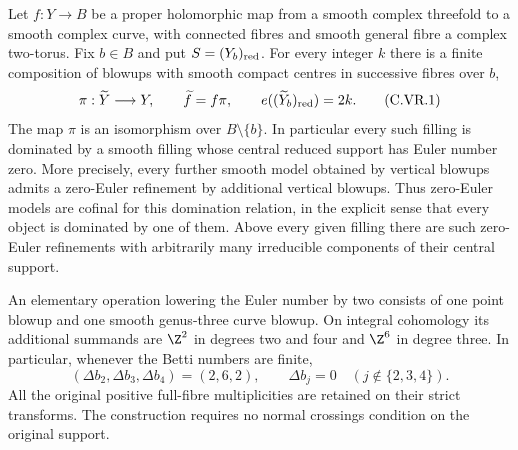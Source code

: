 \begin{proposition}\label{cdp:st:C.2.UN.4}

Let $f:Y\to B$ be a proper holomorphic map from a smooth complex
threefold to a smooth complex curve, with connected fibres and smooth
general fibre a complex two-torus. Fix $b\in B$ and put
$S=(Y_b)_{\rm red}$. For every integer $k$ there is a finite composition
of blowups with smooth compact centres in successive fibres over $b$,
\[
 \pi:\widetilde Y\longrightarrow Y,\qquad
 \widetilde f=f\pi,\qquad
 e((\widetilde Y_b)_{\rm red})=2k.                 \tag{C.VR.1}\label{cdp:eq:C.VR.1}
\]
The map $\pi$ is an isomorphism over $B\setminus\{b\}$.
In particular every such filling is dominated by a smooth filling
whose central reduced support has Euler number zero. More precisely,
every further smooth model obtained by vertical blowups admits a
zero-Euler refinement by additional vertical blowups. Thus zero-Euler
models are cofinal for this domination relation, in the explicit sense
that every object is dominated by one of them.
Above every given filling there are such zero-Euler refinements with
arbitrarily many irreducible components of their central support.

An elementary operation lowering the Euler number by two consists of
one point blowup and one smooth genus-three curve blowup. On integral
cohomology its additional summands are $\Z^2$ in degrees two and four
and $\Z^6$ in degree three. In particular, whenever the Betti numbers
are finite,
\[
 (\Delta b_2,\Delta b_3,\Delta b_4)=(2,6,2),
 \qquad \Delta b_j=0\quad(j\notin\{2,3,4\}).       \tag{C.VR.2}\label{cdp:eq:C.VR.2}
\]
All the original positive full-fibre multiplicities are retained on
their strict transforms. The construction requires no normal crossings
condition on the original support.
\end{proposition}

